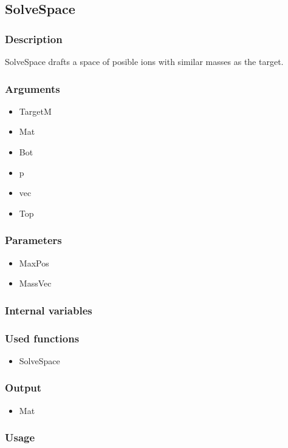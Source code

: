 \subsection{SolveSpace}
\subsubsection{Description}
SolveSpace drafts a space of posible ions with similar masses as the target.
\subsubsection{Arguments}
\begin{itemize}
\item TargetM
\item Mat
\item Bot
\item p
\item vec
\item Top
\end{itemize}
\subsubsection{Parameters}
\begin{itemize}
\item MaxPos
\item MassVec %
\end{itemize}
\subsubsection{Internal variables}
\subsubsection{Used functions}
\begin{itemize}
\item SolveSpace
\end{itemize}
\subsubsection{Output}
\begin{itemize}
\item Mat
\end{itemize}
\subsubsection{Usage}


